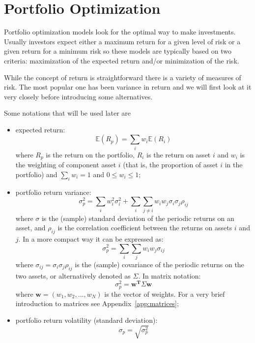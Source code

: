 \chapter{Portfolio Optimization}\label{portfolio-optimization}

Portfolio optimization models look for the optimal way to make investments. Usually investors expect 
either a maximum return for a given level of risk or a given return for a minimum risk so these models
are typically based on two criteria: maximization of the expected return and/or minimization of the risk.

While the concept of return is straightforward there is a variety of measures of risk. 
The most popular one has been variance in return and we will first look at it very closely before introducing some alternatives.

Some notations that will be used later are

\begin{itemize}
\tightlist
\item
  expected return: \begin{equation} \mathbb{E}(R_{p}) = \sum _{i}w_{i} \mathbb{E}(R_{i}) \end{equation} where
  \(R_{p}\) is the return on the portfolio, \(R_{i}\) is the return on
  asset \(i\) and \(w_{i}\) is the weighting of component asset \(i\)
  (that is, the proportion of asset \(i\) in the portfolio) and
  \(\sum_{i}w_i = 1\) and \(0 \le w_i \le 1\);
\item
  portfolio return variance:
  \begin{equation} \sigma _{p}^{2} = \sum _{i}w_{i}^{2}\sigma _{i}^{2} + \sum _{i}\sum _{j\neq i}w_{i}w_{j}\sigma _{i}\sigma _{j}\rho _{ij} \end{equation}
  where \(\sigma\) is the (sample) standard deviation of the periodic
  returns on an asset, and \(\rho _{ij}\) is the correlation coefficient
  between the returns on assets \(i\) and \(j\). In a more compact way
  it can be expressed as:
  \begin{equation} \sigma _{p}^{2}=\sum _{i}\sum _{j}w_{i}w_{j}\sigma _{ij} \end{equation} where
  \(\sigma _{ij}=\sigma _{i}\sigma _{j}\rho _{ij}\) is the (sample)
  covariance of the periodic returns on the two assets, or alternatively
  denoted as \(\Sigma\).
  In matrix notation:
  \begin{equation}\sigma_p^2 = \mathbf{w^T}\Sigma\mathbf{w} \end{equation}
  where $\mathbf{w} = (w_1,w_2,\ldots,w_N)$ is the vector of weights. 
  For a very brief introduction to matrices see Appendix~\ref{app:matrices};
\item
  portfolio return volatility (standard deviation):
  \begin{equation}\sigma _{p}= \sqrt{\sigma _{p}^{2}}\end{equation}
\end{itemize}

